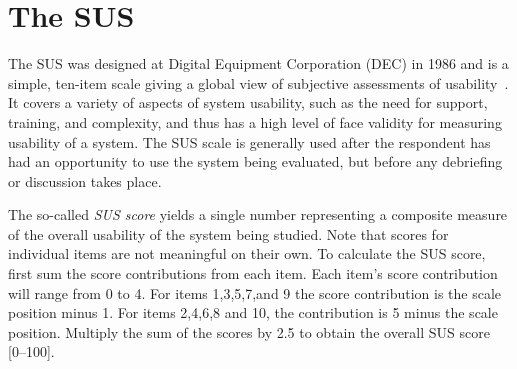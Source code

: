 
\chapter{The \acf{SUS}}
\label{app:sus}

The \acf{SUS} was designed at Digital Equipment Corporation (DEC) in 1986 and is a simple, ten-item scale giving a global view of subjective assessments of usability~\cite{brooke1996sus}.
It covers a variety of aspects of system usability, such as the need for support, training, and complexity, and thus has a high level of face validity for measuring usability of a system.
%
The \ac{SUS} scale is generally used after the respondent has had an opportunity to use the system being evaluated, but before any debriefing or discussion takes place.

The so-called \textit{\ac{SUS} score} yields a single number representing a composite measure of the overall usability of the system being studied. Note that scores for individual items are not meaningful on their own.
To calculate the \ac{SUS} score, first sum the score contributions from each item. Each item's score contribution will range from 0 to 4. For items 1,3,5,7,and 9 the score contribution is the scale position minus 1. For items 2,4,6,8 and 10, the contribution is 5 minus the scale position. Multiply the sum of the scores by 2.5 to obtain the overall \ac{SUS} score [0--100].

